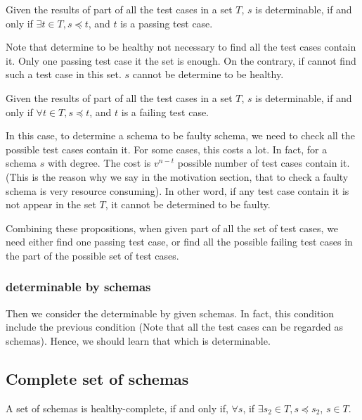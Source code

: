 \begin{proposition}\label{pro:determinableparthealthy}
Given the results of part of all the test cases in a set $T$, $s$ is determinable, if and only if $\exists t \in T, s \preceq t$, and $t$ is a passing test case.
\end{proposition}

Note that determine to be healthy not necessary to find all the test cases contain it. Only one passing test case it the set is enough. On the contrary, if cannot find such a test case in this set. $s$ cannot be determine to be healthy.

\begin{proposition}\label{pro:determinablepartfaulty}
Given the results of part of all the test cases in a set $T$, $s$ is determinable, if and only if $\forall t \in T, s \preceq t$, and $t$ is a failing test case.
\end{proposition}

In this case, to determine a schema to be faulty schema, we need to check all the possible test cases contain it. For some cases, this costs a lot. In fact, for a schema $s$ with degree. The cost is $v^{n-t}$ possible number of test cases contain it. (This is the reason why we say in the motivation section, that to check a faulty schema is very resource consuming).  In other word, if any test case contain it is not appear in the set $T$, it cannot be determined to be faulty.


Combining these propositions, when given part of all the set of test cases, we need either find one passing test case, or find all the possible failing test cases in the part of the possible set of test cases.


\subsubsection{determinable by schemas}

Then we consider the determinable by given schemas. In fact, this condition include the previous condition (Note that all the test cases can be regarded as schemas). Hence, we should learn that which is determinable. 

\subsection{Complete set of schemas}

\begin{definition}
A set of schemas is healthy-complete, if and only if, $\forall s$, if $ \exists s_{2} \in T, s \preceq s_{2}$, $s \in T$.
\end{definition}

